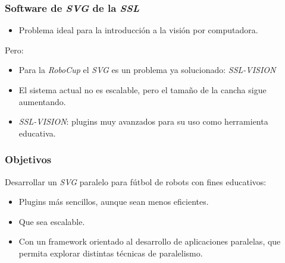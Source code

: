 \documentclass[11pt,a4paper,spanish]{beamer}
\begin{document}
\begin{frame}

\frametitle{Software de \emph{SVG} de la \emph{SSL}}

\begin{itemize}

	\item Problema ideal para la introducción a la visión por computadora.

\end{itemize}

Pero:

\begin{itemize}

	\item Para la \emph{RoboCup} el \emph{SVG} es un problema ya
		solucionado: \emph{SSL-VISION}

	\item El sistema actual no es escalable, pero el tamaño de la cancha
		sigue aumentando.

	\item \emph{SSL-VISION}: plugins muy avanzados para su uso como
		herramienta educativa.

\end{itemize}

\end{frame}

\begin{frame}

\frametitle{Objetivos}

Desarrollar un \emph{SVG} paralelo para fútbol de robots con fines educativos:

\begin{itemize}

	\item Plugins más sencillos, aunque sean menos eficientes.

	\item Que sea escalable.

	\item Con un framework orientado al desarrollo de aplicaciones
		paralelas, que permita explorar distintas técnicas de
		paralelismo.

\end{itemize}

\end{frame}
\end{document}

